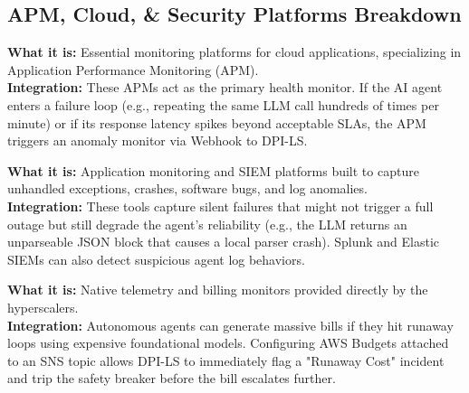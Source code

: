 \documentclass[11pt,a4paper]{article}
\begin{document}
\subsection{APM, Cloud, \& Security Platforms Breakdown}

\vspace{0.3cm}
\begin{tcolorbox}[enhanced, colback=dpired!5!white, colframe=dpired, title={\textbf{\faChartLine\ Datadog / Dynatrace / New Relic}}, fonttitle=\bfseries, boxrule=1pt, arc=2mm]
\textbf{\color{dpired}What it is:} Essential monitoring platforms for cloud applications, specializing in Application Performance Monitoring (APM). \\[0.2cm]
\textbf{\color{dpired}Integration:} These APMs act as the primary health monitor. If the AI agent enters a failure loop (e.g., repeating the same LLM call hundreds of times per minute) or if its response latency spikes beyond acceptable SLAs, the APM triggers an anomaly monitor via Webhook to DPI-LS.
\end{tcolorbox}


\vspace{0.3cm}
\begin{tcolorbox}[enhanced, colback=dpired!5!white, colframe=dpired, title={\textbf{\faBug\ Sentry / Splunk / Elastic}}, fonttitle=\bfseries, boxrule=1pt, arc=2mm]
\textbf{\color{dpired}What it is:} Application monitoring and SIEM platforms built to capture unhandled exceptions, crashes, software bugs, and log anomalies. \\[0.2cm]
\textbf{\color{dpired}Integration:} These tools capture silent failures that might not trigger a full outage but still degrade the agent's reliability (e.g., the LLM returns an unparseable JSON block that causes a local parser crash). Splunk and Elastic SIEMs can also detect suspicious agent log behaviors.
\end{tcolorbox}

\vspace{0.3cm}
\begin{tcolorbox}[enhanced, colback=dpicloud!5!white, colframe=dpicloud, title={\textbf{\faCloud\ Cloud-Native Integrations (AWS CloudWatch, Azure Monitor)}}, fonttitle=\bfseries, boxrule=1pt, arc=2mm]
\textbf{\color{dpicloud}What it is:} Native telemetry and billing monitors provided directly by the hyperscalers. \\[0.2cm]
\textbf{\color{dpicloud}Integration:} Autonomous agents can generate massive bills if they hit runaway loops using expensive foundational models. Configuring AWS Budgets attached to an SNS topic allows DPI-LS to immediately flag a "Runaway Cost" incident and trip the safety breaker before the bill escalates further.
\end{tcolorbox}
\end{document}
